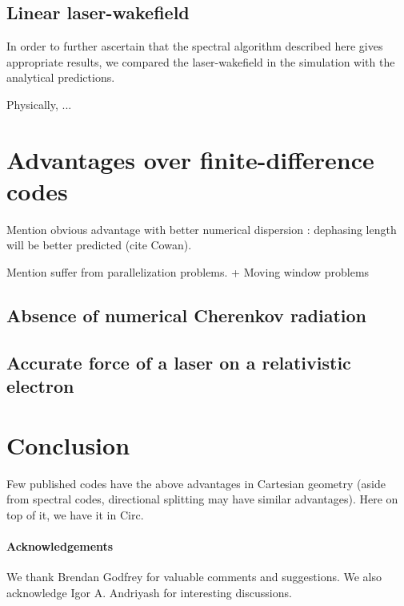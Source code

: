 \documentclass[a4paper]{article}   	%
\begin{document}
\subsection{Linear laser-wakefield}

In order to further ascertain that the spectral algorithm described here gives
appropriate results, we compared the laser-wakefield in the simulation with the
analytical predictions. 

Physically, ...



\section{Advantages over finite-difference codes}
\label{sec:advantages}



Mention obvious advantage with better numerical dispersion : dephasing
length will be better predicted (cite Cowan). 

Mention suffer from parallelization problems. + Moving window problems


\subsection{Absence of numerical Cherenkov radiation}

\subsection{Accurate force of a laser on a relativistic electron}


\section*{Conclusion}

Few published codes have the above advantages in Cartesian geometry (aside
from spectral codes, directional splitting may have similar
advantages). Here on top of it, we have it in Circ.

\paragraph{Acknowledgements}

We thank Brendan Godfrey for valuable comments and
suggestions. We also acknowledge Igor A. Andriyash for interesting
discussions.

\newpage
\appendix





\end{document}
